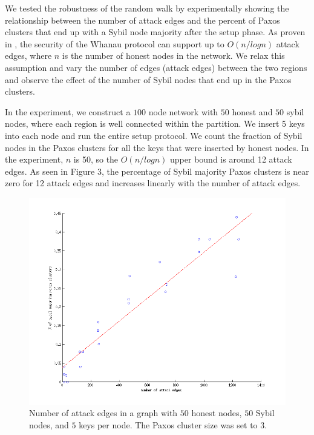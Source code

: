 \documentclass[letter]{article}
\begin{document}
We tested the robustness of the random walk by experimentally showing the relationship between the number
of attack edges and the percent of Paxos clusters that end up with a Sybil node majority after the setup phase.
As proven in \cite{Whanau}, the security of the Whanau protocol can support
up to $O(n/logn)$ attack edges, where $n$ is the number of honest nodes in the network.
We relax this assumption and vary the number of edges (attack edges) between the two regions 
and observe the effect of the number of Sybil nodes that end up in the Paxos clusters.

In the experiment, we construct a $100$ node network with $50$ honest and $50$ sybil nodes, where each region is well connected within the partition.
We insert 5 keys into each node and run the entire setup protocol. We count the fraction of
Sybil nodes in the Paxos clusters for all the keys that were inserted by honest nodes.
In the experiment, $n$ is 50, so the $O(n/logn)$ upper bound is around 12 attack edges.
As seen in Figure 3, the percentage of Sybil majority Paxos clusters is near zero for 12 attack edges
and increases linearly with the number of attack edges.

\begin{figure}[h]
\centering
\includegraphics[width=1.0\columnwidth]{sybilcluster-3}
\caption{Number of attack edges in a graph with $50$ honest nodes, $50$ Sybil nodes, and $5$ keys per node. The Paxos cluster size was set to $3$.}
\label{fig:sybilcluster-3}
\end{figure}
\end{document}
